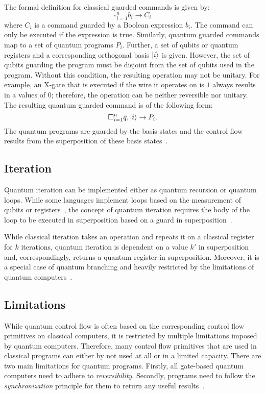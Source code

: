The formal definition for classical guarded commands is given by:
\begin{equation*}
    \square^n_{i=1} b_i \to C_i
\end{equation*}
where $C_i$ is a command guarded by a Boolean expression $b_i$. The command can only be executed if the expression is true. Similarly, quantum guarded commands map to a set of quantum programs $P_i$. Further, a set of qubits or quantum registers and a corresponding orthogonal basis $\ket{i}$ is given. However, the set of qubits guarding the program must be disjoint from the set of qubits used in the program. Without this condition, the resulting operation may not be unitary. For example, an X-gate that is executed if the wire it operates on is $1$ always results in a values of $0$; therefore, the operation can be neither reversible nor unitary. The resulting quantum guarded command is of the following form:
\begin{equation*}
    \square^n_{i=1} \bar{q}, \ket{i} \to P_i.
\end{equation*} 
The quantum programs are guarded by the basis states and the control flow results from the superposition of these basis states~\cite{YYF12}. 

\subsection{Iteration}
\label{sec:background_iteration}
Quantum iteration can be implemented either as quantum recursion or quantum loops. While some languages implement loops based on the measurement of qubits or registers~\cite{Ying11}, the concept of quantum iteration requires the body of the loop to be executed in superposition based on a guard in superposition~\cite{YYF12}.

While classical iteration takes an operation and repeats it on a classical register for $k$ iterations, quantum iteration is dependent on a value $k'$ in superposition and, correspondingly, returns a quantum register in superposition. Moreover, it is a special case of quantum branching and heavily restricted by the limitations of quantum computers~\cite{YVC24}.    

\subsection{Limitations}
\label{sec:background_limitations}	
While quantum control flow is often based on the corresponding control flow primitives on classical computers, it is restricted by multiple limitations imposed by quantum computers. Therefore, many control flow primitives that are used in classical programs can either by not used at all or in a limited capacity. There are two main limitations for quantum programs. Firstly, all gate-based quantum computers need to adhere to \emph{reversibility}. Secondly, programs need to follow the \emph{synchronization} principle for them to return any useful results~\cite{YVC24}.

